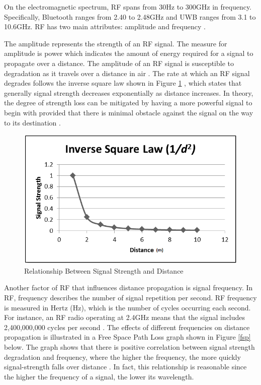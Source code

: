 \medskip
On the electromagnetic spectrum, RF spans from 30Hz to 300GHz in frequency. Specifically, Bluetooth ranges from 2.40 to 2.48GHz and UWB ranges from 3.1 to 10.6GHz. RF has two main attributes: amplitude and frequency \cite{R2-4-1}.

\medskip
The amplitude represents the strength of an RF signal. The measure for amplitude is power which indicates the amount of energy required for a signal to propagate over a distance. The amplitude of an RF signal is susceptible to degradation as it travels over a distance in air \cite{R2-4-1}. The rate at which an RF signal degrades follows the inverse square law shown in Figure \ref{isl} , which states that generally signal strength decreases exponentially as distance increases. In theory, the degree of strength loss can be mitigated by having a more powerful signal to begin with provided that there is minimal obstacle against the signal on the way to its destination \cite{R2-4-2}.

\medskip
\begin{figure}[H]
\centering
    \includegraphics[width=\linewidth]{./images/ISL.png}
    \caption{Relationship Between Signal Strength and Distance}
    \label{isl}
\end{figure}


\medskip
Another factor of RF that influences distance propagation is signal frequency. In RF, frequency describes the number of signal repetition per second. RF frequency is measured in Hertz (Hz), which is the number of cycles occurring each second. For instance, an RF radio operating at 2.4GHz means that the signal includes 2,400,000,000 cycles per second \cite{R2-4-1}. The effects of different frequencies on distance propagation is illustrated in a Free Space Path Loss graph shown in Figure \ref{fsp} below. The graph shows that there is positive correlation between signal strength degradation and frequency, where the higher the frequency, the more quickly signal-strength falls over distance \cite{R2-4-2}. In fact, this relationship is reasonable since the higher the frequency of a signal, the lower its wavelength. 

